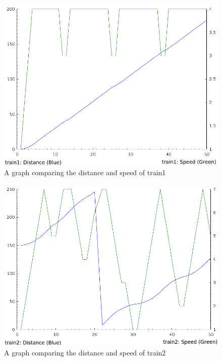 \begin{figure}
\begin{center}
\includegraphics[scale=0.5]{t1graph.png}
\end{center}
\caption{A graph comparing the distance and speed of train1}
\end{figure}

\begin{figure}
\begin{center}
\includegraphics[scale=0.64]{t2graph.png}
\end{center}
\caption{A graph comparing the distance and speed of train2}
\end{figure}


